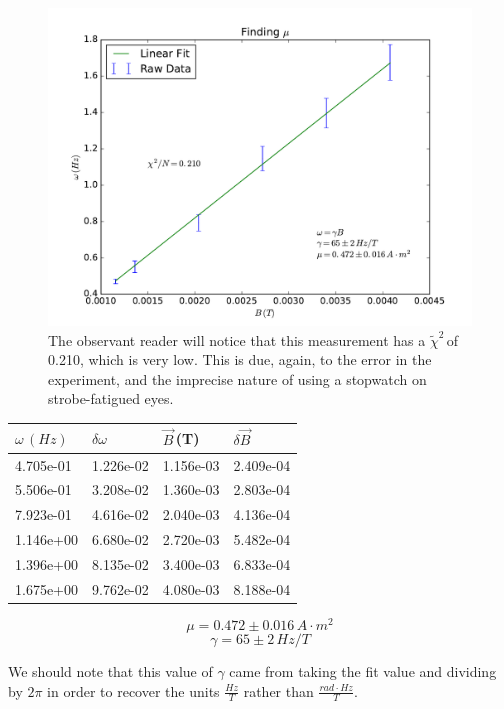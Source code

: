 \documentclass{article}
\newcommand{\redchi}{$\tilde{\chi}^2\,$}
\newcommand{\B}{$\vec{B}\,$}
\begin{document}
	\begin{figure}[!htb]
		\centering
		\includegraphics[scale=.5]{../plots/omegavsb.pdf}
		\caption{The observant reader will notice that this measurement has a \redchi of 0.210, which is very low.  This is due, again, to the error in the experiment, and the imprecise nature of using a stopwatch on strobe-fatigued eyes.}
	\end{figure}

	\begin{center}
	\begin{tabular}{|l|l|l|l|}
		\hline
		$\omega \, (H\!z)$ & $\delta \omega$ & \B (T)& $\delta$\B \\
		\hline
		4.705e-01 & 1.226e-02 & 1.156e-03 & 2.409e-04 \\
		5.506e-01 & 3.208e-02 & 1.360e-03 & 2.803e-04 \\
		7.923e-01 & 4.616e-02 & 2.040e-03 & 4.136e-04 \\
		1.146e+00 & 6.680e-02 & 2.720e-03 & 5.482e-04 \\
		1.396e+00 & 8.135e-02 & 3.400e-03 & 6.833e-04 \\
		1.675e+00 & 9.762e-02 & 4.080e-03 & 8.188e-04 \\
		\hline
	\end{tabular}
	\end{center}

	$$\boxed{\mu = 0.472 \pm 0.016 \, A \cdot m^2}$$
	$$\boxed{\gamma = 65 \pm 2 \, Hz/T}$$

	We should note that this value of $\gamma$ came from taking the fit value and dividing by $2\pi$ in order to recover the units $\frac{Hz}{T}$ rather than $\frac{rad\cdot H\!z}{T}$.
\end{document}
